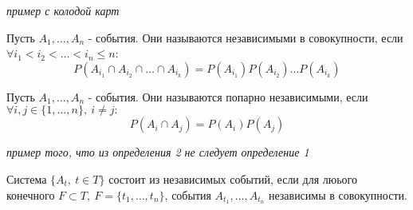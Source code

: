 \documentclass[a4paper, 12pt]{article}
\begin{document}
\begin{example}
    \textit{пример с колодой карт}
\end{example}
\begin{definition}
    Пусть $A_1,\dots,A_n$ - события. Они называются независимыми в совокупности, если $\forall i_1<i_2<\dots<i_n\leq n$:
    \[P(A_{i_1}\cap A_{i_2}\cap \dots \cap A_{i_k})=P(A_{i_1}) P(A_{i_2}) \dots P(A_{i_k})\]
\end{definition}
\begin{definition}
    Пусть $A_1,\dots,A_n$ - события. Они называются попарно независимыми, если $\forall i,j\in \{1,\dots,n\},\ i\ne j:$
    \[P(A_i\cap A_j)=P(A_i)P(A_j)\]
\end{definition}
\begin{example}
    \textit{пример того, что из определения 2 не следует определение 1}
\end{example}
\begin{definition}
    Система $\{A_t,\ t\in T\}$ состоит из независимых событий, если для люього конечного $F\subset T,\ F=\{t_1,\dots,t_n\}$, события $A_{t_1},\dots, A_{t_n}$ независимы в совокупности.
\end{definition}
\end{document}
